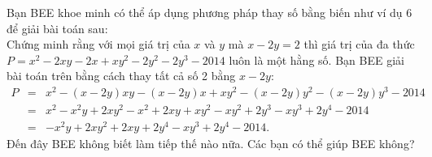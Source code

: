 \begin{vd}%
	Bạn BEE khoe minh có thể áp dụng phương pháp thay số bằng biến như ví dụ 6 để giải bài toán sau:\\
	Chứng minh rằng với mọi giá trị của $x$ và $y$ mà $x-2y=2$ thì giá trị của đa thức $P=x^2-2xy-2x+xy^2-2y^2-2y^3-2014$ luôn là một hằng số. Bạn BEE giải bài toán trên bằng cách thay tất cả số 2 bằng $x-2y$:
	\begin{eqnarray*}
		P&=&x^2-(x-2y)xy-(x-2y)x+xy^2-(x-2y)y^2-(x-2y)y^3-2014\\
		&=&x^2-x^2y+2xy^2-x^2+2xy+xy^2-xy^2+2y^3-xy^3+2y^4-2014\\
		&=&-x^2y+2xy^2+2xy+2y^4-xy^3+2y^4-2014.
	\end{eqnarray*}
	Đến đây BEE không biết làm tiếp thế nào nữa. Các bạn có thể giúp BEE không?
\end{vd}


